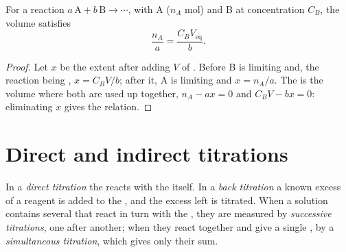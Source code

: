 \begin{proposition}\label{prop:b1:titration-methods:equivalence}
For a  reaction $a\,\mathrm{A} + b\,\mathrm{B} \to \cdots$, with
 A ($n_A$ mol) and  B at concentration $C_B$, the
 volume satisfies
\[
  \frac{n_A}{a} = \frac{C_B V_{\mathrm{eq}}}{b} .
\]
\end{proposition}

\begin{proof}
Let $x$ be the extent after adding $V$ of . Before  B
is limiting and, the reaction being , $x = C_BV/b$; after it,
A is limiting and $x = n_A/a$. The  is the volume where both
are used up together, $n_A - ax = 0$ and $C_BV - bx = 0$: eliminating $x$
gives the relation.
\end{proof}

\section{Direct and indirect titrations}

\begin{definition}\label{def:b1:titration-methods:kinds}
In a \emph{direct titration} the  reacts
with the  itself. In a \emph{back titration}
a known excess of a reagent is added to the , and the excess left
is titrated. When a solution contains several  that react in
turn with the , they are measured by \emph{successive
titrations}, one  after another;
when they react together and give a single , by a
\emph{simultaneous titration}, which gives
only their sum.
\end{definition}

